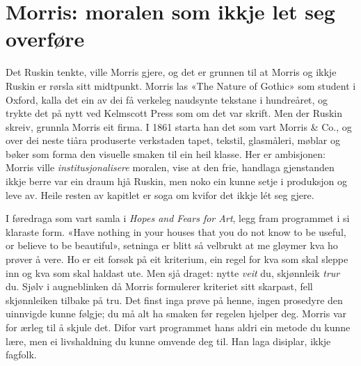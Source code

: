 \section{Morris: moralen som ikkje let seg overføre}

Det Ruskin tenkte, ville Morris gjere, og det er grunnen til at Morris og ikkje Ruskin er rørsla sitt midtpunkt. Morris las «The Nature of Gothic» som student i Oxford, kalla det ein av dei få verkeleg naudsynte tekstane i hundreåret, og trykte det på nytt ved Kelmscott Press som om det var skrift. Men der Ruskin skreiv, grunnla Morris eit firma. I 1861 starta han det som vart Morris \& Co., og over dei neste tiåra produserte verkstaden tapet, tekstil, glasmåleri, møblar og bøker som forma den visuelle smaken til ein heil klasse. Her er ambisjonen: Morris ville \emph{institusjonalisere} moralen, vise at den frie, handlaga gjenstanden ikkje berre var ein draum hjå Ruskin, men noko ein kunne setje i produksjon og leve av. Heile resten av kapitlet er soga om kvifor det ikkje lét seg gjere.

I føredraga som vart samla i \textit{Hopes and Fears for Art}, legg \textcite{morris1882hopes} fram programmet i si klaraste form. «Have nothing in your houses that you do not know to be useful, or believe to be beautiful», setninga er blitt så velbrukt at me gløymer kva ho prøver å vere. Ho er eit forsøk på eit kriterium, ein regel for kva som skal sleppe inn og kva som skal haldast ute. Men sjå draget: nytte \emph{veit} du, skjønnleik \emph{trur} du. Sjølv i augneblinken då Morris formulerer kriteriet sitt skarpast, fell skjønnleiken tilbake på tru. Det finst inga prøve på henne, ingen prosedyre den uinnvigde kunne følgje; du må alt ha smaken før regelen hjelper deg. Morris var for ærleg til å skjule det. Difor vart programmet hans aldri ein metode du kunne lære, men ei livshaldning du kunne omvende deg til. Han laga disiplar, ikkje fagfolk.

